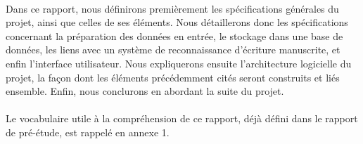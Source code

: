 \paragraph{}
Dans ce rapport, nous définirons premièrement les spécifications générales du
projet, ainsi que celles de ses éléments. Nous détaillerons donc les
spécifications concernant la préparation des données en entrée, le stockage
dans une base de données, les liens avec un système de reconnaissance
d’écriture manuscrite, et enfin l’interface utilisateur. Nous expliquerons
ensuite l’architecture logicielle du projet, la façon dont les éléments
précédemment cités seront construits et liés ensemble. Enfin, nous conclurons
en abordant la suite du projet.

\paragraph{}
Le vocabulaire utile à la compréhension de ce rapport, déjà défini dans le
rapport de pré-étude, est rappelé en annexe 1.
